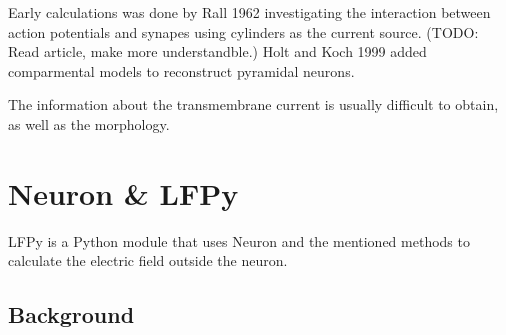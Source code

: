 \documentclass[altfont, fleqn]{uiophd}
\begin{document}
Early calculations was done by Rall 1962 investigating 
the interaction between action potentials and synapes using cylinders
as the current source. (TODO: Read article, make more understandble.)
Holt and Koch 1999 added comparmental models to reconstruct pyramidal neurons. 

The information about the transmembrane current is usually difficult to obtain,
as well as the morphology.


\section{Neuron \& LFPy }
LFPy is a Python module that uses Neuron and the mentioned methods to calculate the 
electric field outside the neuron. 
\cite{linden_lfpy:_2013}
\subsection*{Background}





\end{document}
